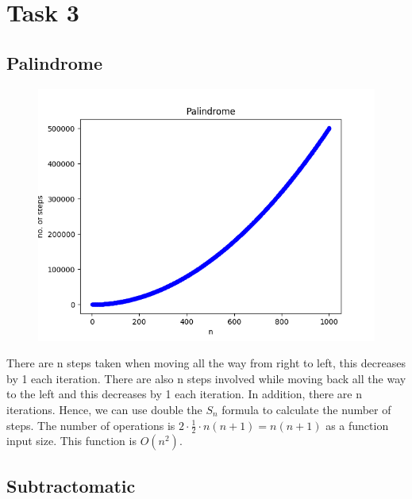 \documentclass{article}
\begin{document}
\section{Task 3}

\subsection{Palindrome}

\begin{figure}[!htb]
  \caption{}
  \centering
  \includegraphics[scale=0.50]{images/palindrome_graph.png}
\end{figure}

There are n steps taken when moving all the way from right to left, this decreases by 1 each iteration. There are also n steps involved while moving back all the way to the left and this decreases by 1 each iteration. In addition, there are n iterations. Hence, we can use double the $ S_n $ formula to calculate the number of steps. The number of operations is $ 2 \cdot \frac{1}{2} \cdot n (n+1) = n (n + 1)$ as a function input size. This function is $O(n^2)$.

\subsection{Subtractomatic}
\end{document}
